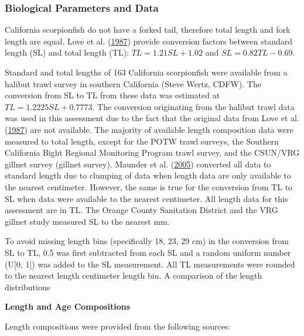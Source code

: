 \documentclass[12pt,]{article}
\begin{document}
\subsubsection{Biological Parameters and
Data}\label{biological-parameters-and-data}

California scorpionfish do not have a forked tail, therefore total
length and fork length are equal. Love et al.
(\protect\hyperlink{ref-Love1987}{1987}) provide conversion factors
between standard length (SL) and total length (TL):
\(TL = 1.21SL + 1.02\) and \(SL = 0.82TL - 0.69\).

Standard and total lengths of 163 California scorpionfish were available
from a halibut trawl survey in southern California (Steve Wertz, CDFW).
The conversion from SL to TL from these data was estimated at
\(TL = 1.2225SL + 0.7773\). The conversion originating from the halibut
trawl data was used in this assessment due to the fact that the original
data from Love et al. (\protect\hyperlink{ref-Love1987}{1987}) are not
available. The majority of available length composition data were
measured to total length, except for the POTW trawl surveys, the
Southern California Bight Regional Monitoring Program trawl survey, and
the CSUN/VRG gillnet survey (gillnet survey). Maunder et al.
(\protect\hyperlink{ref-Maunder2005}{2005}) converted all data to
standard length due to clumping of data when length data are only
available to the nearest centimeter. However, the same is true for the
conversion from TL to SL when data were available to the nearest
centimeter. All length data for this assessment are in TL. The Orange
County Sanitation District and the VRG gillnet study measured SL to the
nearest mm.

To avoid missing length bins (specifically 18, 23, 29 cm) in the
conversion from SL to TL, 0.5 was first subtracted from each SL and a
random uniform number (U{[}0, 1{]}) was added to the SL measurement. All
TL measurements were rounded to the nearest length centimeter length
bin. A comparison of the length distributions

\textbf{Length and Age Compositions}

Length compositions were provided from the following sources:
\end{document}
